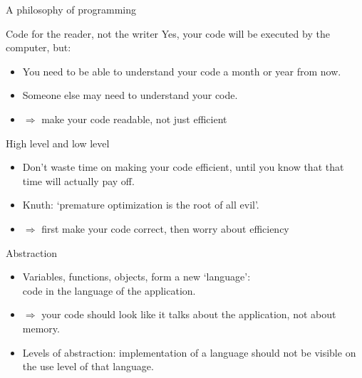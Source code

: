 

 {A philosophy of programming}

\begin{block}{Code for the reader, not the writer}
  Yes, your code will be executed by the computer, but:
  \begin{itemize}
  \item You need to be able to understand your code a month or year
    from now.
  \item Someone else may need to understand your code.
  \item $\Rightarrow$ make your code readable, not just efficient
  \end{itemize}
\end{block}

\begin{block}{High level and low level}
  \begin{itemize}
  \item Don't waste time on making your code efficient, until you know
    that that time will actually pay off.
  \item Knuth: `premature optimization is the root of all evil'.
  \item $\Rightarrow$ first make your code correct, then worry about efficiency
  \end{itemize}
\end{block}

\begin{block}{Abstraction}
  \begin{itemize}
  \item Variables, functions, objects, form a new `language':\\
    code in the language of the application.
  \item $\Rightarrow$ your code should look like it talks about the
    application, not about memory.
  \item Levels of abstraction: implementation of a language should not be
    visible on the use level of that language.
  \end{itemize}
\end{block}


